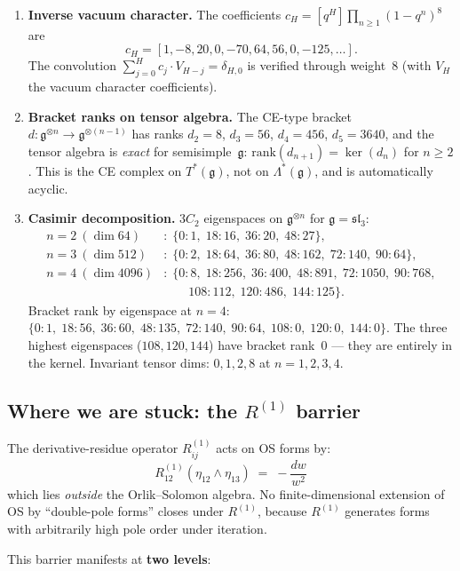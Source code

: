 \documentclass[11pt]{article}
\newcommand{\fg}{\mathfrak{g}}
\newcommand{\fsl}{\mathfrak{sl}}
\begin{document}
\begin{enumerate}[label=(\roman*)]
\item \textbf{Inverse vacuum character.}
The coefficients $c_H = [q^H]\prod_{n\geq 1}(1-q^n)^8$ are
\[
  c_H = [1,-8,20,0,-70,64,56,0,-125,\ldots].
\]
The convolution $\sum_{j=0}^{H} c_j \cdot V_{H-j} = \delta_{H,0}$
is verified through weight~$8$ (with $V_H$ the vacuum character
coefficients).

\item \textbf{Bracket ranks on tensor algebra.}
The CE-type bracket $d\colon\fg^{\otimes n}\to\fg^{\otimes(n-1)}$
has ranks $d_2 = 8$, $d_3 = 56$, $d_4 = 456$, $d_5 = 3640$,
and the tensor algebra is \emph{exact} for semisimple~$\fg$:
$\mathrm{rank}(d_{n+1}) = \ker(d_n)$ for $n\geq 2$.  This is the
CE complex on $T^*(\fg)$, not on $\Lambda^*(\fg)$, and is
automatically acyclic.

\item \textbf{Casimir decomposition.}
$3C_2$ eigenspaces on $\fg^{\otimes n}$ for $\fg = \fsl_3$:
\begin{align*}
  n=2\ (\dim 64)&:\; \{0:1,\; 18:16,\; 36:20,\; 48:27\}, \\
  n=3\ (\dim 512)&:\; \{0:2,\; 18:64,\; 36:80,\; 48:162,\; 72:140,\; 90:64\}, \\
  n=4\ (\dim 4096)&:\; \{0:8,\; 18:256,\; 36:400,\; 48:891,\; 72:1050,\; 90:768,\\
    &\qquad 108:112,\; 120:486,\; 144:125\}.
\end{align*}
Bracket rank by eigenspace at $n=4$:
$\{0:1,\;18:56,\;36:60,\;48:135,\;72:140,\;90:64,\;
108:0,\;120:0,\;144:0\}$.
The three highest eigenspaces ($108, 120, 144$) have
bracket rank~$0$ --- they are entirely in the kernel.
Invariant tensor dims: $0, 1, 2, 8$ at $n = 1,2,3,4$.
\end{enumerate}

\subsection{Where we are stuck: the $R^{(1)}$ barrier}

The derivative-residue operator $R^{(1)}_{ij}$ acts on OS forms by:
\[
  R^{(1)}_{12}(\eta_{12}\wedge\eta_{13})
  \;=\; -\frac{dw}{w^2}
\]
which lies \emph{outside} the Orlik--Solomon algebra.  No
finite-dimensional extension of OS by ``double-pole forms'' closes
under $R^{(1)}$, because $R^{(1)}$ generates forms with arbitrarily
high pole order under iteration.

This barrier manifests at \textbf{two levels}:
\end{document}
